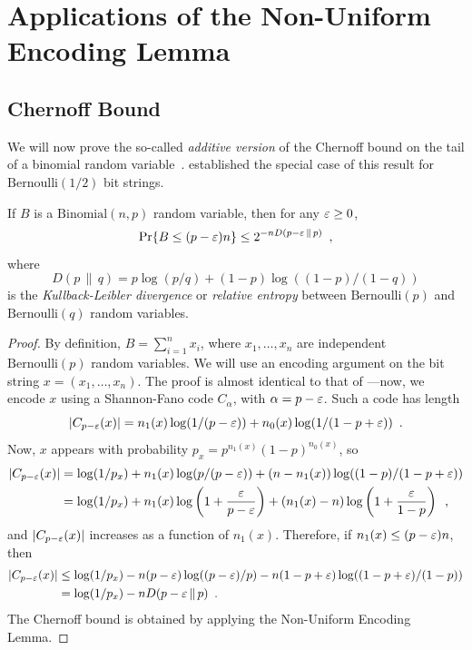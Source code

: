 \documentclass[format=acmsmall, review=false, screen=true]{acmart}
\begin{document}
\section{Applications of the Non-Uniform Encoding Lemma}

\subsection{Chernoff Bound}

We will now prove the so-called \emph{additive version} of the
Chernoff bound on the tail of a binomial random
variable~\cite{chernoff:bound}.  established
the special case of this result for $\mathrm{Bernoulli}(1/2)$ bit
strings.

\begin{thm}
  If $B$ is a $\mathrm{Binomial}(n,p)$ random variable, then for any
  $\varepsilon \geq 0$,
  \[
    \Pr\{B\le(p-\varepsilon)n\} \le 2^{-nD(p-\varepsilon \,\|\, p)} \enspace ,
  \]
  where 
  \[ 
    D(p\, \|\, q)= p\log (p/q) + (1-p)\log ((1 - p)/(1 - q))
  \]
  is the \emph{Kullback-Leibler divergence} or \emph{relative entropy}
  between $\mathrm{Bernoulli}(p)$ and $\mathrm{Bernoulli}(q)$ random
  variables.
\end{thm}

\begin{proof}
  By definition, $B=\sum_{i=1}^n x_i$, where $x_1,\ldots,x_n$ are
  independent $\mathrm{Bernoulli}(p)$ random variables.  We will use
  an encoding argument on the bit string $x=(x_1,\ldots,x_n)$. The
  proof is almost identical to that of ---now,
  we encode $x$ using a Shannon-Fano code $C_\alpha$, with
  $\alpha = p - \varepsilon$. Such a code has length
  \[
    |C_{p - \varepsilon}(x)| = n_1(x) \log (1/(p - \varepsilon)) + n_0(x) \log (1/(1
    - p + \varepsilon)) \enspace .
  \]
  Now, $x$ appears with probability
  $p_x = p^{n_1(x)} (1 - p)^{n_0(x)}$, so
  \begin{align*}
    |C_{p - \varepsilon}(x)| &= \log(1/p_x) + 
         n_1(x) \log (p/(p - \varepsilon)) + (n - n_1(x)) \log ((1 - p)/(1 - p + \varepsilon)) \\
         &= \log (1/p_x) + n_1(x) \log \left(1 + \frac{\varepsilon}{p - \varepsilon}\right) + 
(n_1(x) - n) \log \left(1 + \frac{\varepsilon}{1 - p}\right) \enspace ,
  \end{align*}
  and $|C_{p - \varepsilon}(x)|$ increases as a function of
  $n_1(x)$. Therefore, if $n_1(x) \le (p - \varepsilon)n$, then
  \begin{align*}
    |C_{p - \varepsilon}(x)| &\le \log (1/p_x) - n (p - \varepsilon) \log ((p - \varepsilon)/p) - n (1 - p + \varepsilon) \log ((1 - p + \varepsilon)/(1 - p)) \\
                      &= \log (1/p_x) - n D(p - \varepsilon \,\|\, p) \enspace .
  \end{align*}
  The Chernoff bound is obtained by applying the Non-Uniform Encoding
  Lemma.
\end{proof}
\end{document}
